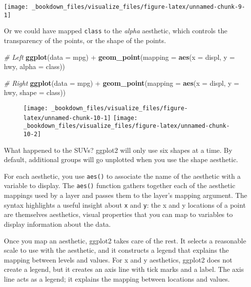 \documentclass[]{book}
\newenvironment{Shaded}{\begin{snugshade}}{\end{snugshade}}
\newcommand{\KeywordTok}[1]{\textcolor[rgb]{0.13,0.29,0.53}{\textbf{{#1}}}}
\newcommand{\DataTypeTok}[1]{\textcolor[rgb]{0.13,0.29,0.53}{{#1}}}
\newcommand{\StringTok}[1]{\textcolor[rgb]{0.31,0.60,0.02}{{#1}}}
\newcommand{\CommentTok}[1]{\textcolor[rgb]{0.56,0.35,0.01}{\textit{{#1}}}}
\newcommand{\NormalTok}[1]{{#1}}
\begin{document}
\begin{center}\texttt{[image: \_bookdown\_files/visualize\_files/figure-latex/unnamed-chunk-9-1]} \end{center}

Or we could have mapped \texttt{class} to the \emph{alpha} aesthetic,
which controls the transparency of the points, or the shape of the
points.

\begin{Shaded}
\begin{Highlighting}[]
\CommentTok{# Left}
\KeywordTok{ggplot}\NormalTok{(}\DataTypeTok{data =} \NormalTok{mpg) +}\StringTok{ }
\StringTok{  }\KeywordTok{geom_point}\NormalTok{(}\DataTypeTok{mapping =} \KeywordTok{aes}\NormalTok{(}\DataTypeTok{x =} \NormalTok{displ, }\DataTypeTok{y =} \NormalTok{hwy, }\DataTypeTok{alpha =} \NormalTok{class))}

\CommentTok{# Right}
\KeywordTok{ggplot}\NormalTok{(}\DataTypeTok{data =} \NormalTok{mpg) +}\StringTok{ }
\StringTok{  }\KeywordTok{geom_point}\NormalTok{(}\DataTypeTok{mapping =} \KeywordTok{aes}\NormalTok{(}\DataTypeTok{x =} \NormalTok{displ, }\DataTypeTok{y =} \NormalTok{hwy, }\DataTypeTok{shape =} \NormalTok{class))}
\end{Highlighting}
\end{Shaded}

\begin{figure}
\texttt{[image: \_bookdown\_files/visualize\_files/figure-latex/unnamed-chunk-10-1]} \texttt{[image: \_bookdown\_files/visualize\_files/figure-latex/unnamed-chunk-10-2]} \end{figure}

What happened to the SUVs? ggplot2 will only use six shapes at a time.
By default, additional groups will go unplotted when you use the shape
aesthetic.

For each aesthetic, you use \texttt{aes()} to associate the name of the
aesthetic with a variable to display. The \texttt{aes()} function
gathers together each of the aesthetic mappings used by a layer and
passes them to the layer's mapping argument. The syntax highlights a
useful insight about \texttt{x} and \texttt{y}: the x and y locations of
a point are themselves aesthetics, visual properties that you can map to
variables to display information about the data.

Once you map an aesthetic, ggplot2 takes care of the rest. It selects a
reasonable scale to use with the aesthetic, and it constructs a legend
that explains the mapping between levels and values. For x and y
aesthetics, ggplot2 does not create a legend, but it creates an axis
line with tick marks and a label. The axis line acts as a legend; it
explains the mapping between locations and values.
\end{document}
